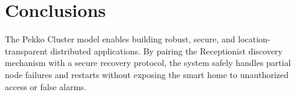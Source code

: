 \documentclass[11pt,a4paper]{article}
\begin{document}
\section{Conclusions}
The Pekko Cluster model enables building robust, secure, and location-transparent distributed applications. By pairing the Receptionist discovery mechanism with a secure recovery protocol, the system safely handles partial node failures and restarts without exposing the smart home to unauthorized access or false alarms.
\end{document}
